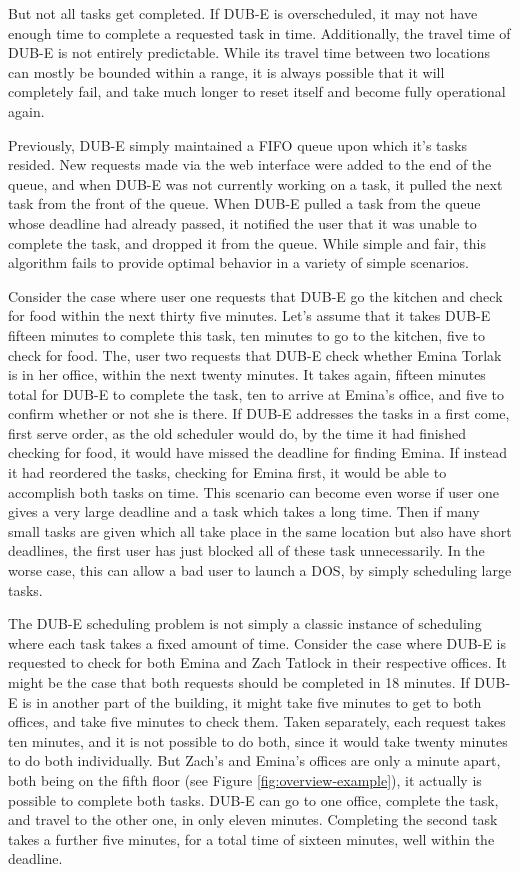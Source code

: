 \documentclass[11pt]{article}
\begin{document}
But not all tasks get completed.
If DUB-E is overscheduled,
it may not have enough time to complete a requested task in time.
Additionally, the travel time of DUB-E
is not entirely predictable.
While its travel time between two locations
can mostly be bounded within a range,
it is always possible that it will completely fail,
and take much longer to reset itself
and become fully operational again.

Previously, DUB-E simply maintained a FIFO queue
upon which it's tasks resided.
New requests made via the web interface
were added to the end of the queue,
and when DUB-E was not currently working on a task,
it pulled the next task from the front of the queue.
When DUB-E pulled a task from the queue
whose deadline had already passed,
it notified the user that it was unable to complete the task,
and dropped it from the queue.
While simple and fair,
this algorithm fails to provide
optimal behavior in a variety of simple scenarios.

Consider the case where user one
requests that DUB-E go the kitchen
and check for food
within the next thirty five minutes.
Let's assume that it takes DUB-E fifteen minutes
to complete this task,
ten minutes to go to the kitchen,
five to check for food.
The, user two requests that DUB-E
check whether Emina Torlak is in her office,
within the next twenty minutes.
It takes again, fifteen minutes total
for DUB-E to complete the task,
ten to arrive at Emina's office,
and five to confirm whether or not she is there.
If DUB-E addresses the tasks in a first come, first serve order,
as the old scheduler would do,
by the time it had finished checking for food,
it would have missed the deadline for finding Emina.
If instead it had reordered the tasks,
checking for Emina first,
it would be able to accomplish both tasks on time.
This scenario can become even worse if user one gives a
very large deadline and a task which takes a long time.
Then if many small tasks are given which all take place in
the same location but also have short deadlines, the first
user has just blocked all of these task unnecessarily.
In the worse case, this can allow a bad user to launch
a DOS, by simply scheduling large tasks.

The DUB-E scheduling problem is not simply
a classic instance of scheduling
where each task takes a fixed amount of time.
Consider the case where DUB-E
is requested to check for both Emina and Zach Tatlock
in their respective offices.
It might be the case that both requests
should be completed in 18 minutes.
If DUB-E is in another part of the building,
it might take five minutes to get to both offices,
and take five minutes to check them.
Taken separately, each request takes ten minutes,
and it is not possible to do both,
since it would take twenty minutes to do both individually.
But Zach's and Emina's offices are only a minute apart,
both being on the fifth floor (see Figure \ref{fig:overview-example}),
it actually is possible to complete both tasks.
DUB-E can go to one office, complete the task,
and travel to the other one,
in only eleven minutes.
Completing the second task takes a further five minutes,
for a total time of sixteen minutes,
well within the deadline.
\end{document}
